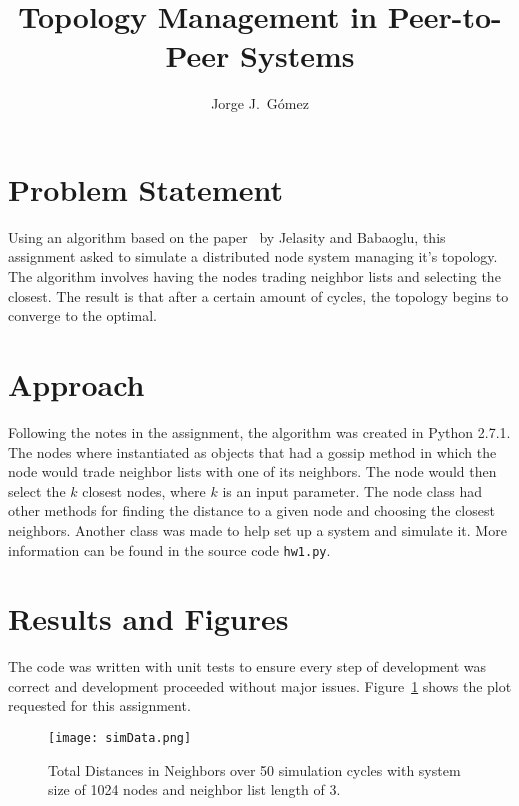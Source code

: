 \documentclass{article}
\begin{document}
\title{Topology Management in Peer-to-Peer Systems}
\author{Jorge J.~G\'omez}

\maketitle
\section{Problem Statement}
  Using an algorithm based on the paper~\cite{t-man} by Jelasity and Babaoglu, 
  this assignment asked to simulate a distributed node system managing it's
  topology. The algorithm involves having the nodes trading neighbor lists and
  selecting the closest. The result is that after a certain amount of cycles,
  the topology begins to converge to the optimal.
\section{Approach}
  Following the notes in the assignment, the algorithm was created in Python
  2.7.1.  The nodes where instantiated as objects that had a gossip method in
  which the node would trade neighbor lists with one of its neighbors. The node
  would then select the $k$ closest nodes, where $k$ is an input parameter. The
  node class had other methods for finding the distance to a given node and
  choosing the closest neighbors.  Another class was made to help set up a
  system and simulate it.  More information can be found in the source code
  \texttt{hw1.py}.
\section{Results and Figures}
  The code was written with unit tests to ensure every step of development was
  correct and development proceeded without major issues. Figure~\ref{results}
  shows the plot requested for this assignment.
  \begin{figure}[h]
    \centering
    \texttt{[image: simData.png]}
    \caption{Total Distances in Neighbors over 50 simulation cycles with system
    size of 1024 nodes and neighbor list length of 3.}
    \label{results}
  \end{figure}



\end{document}
